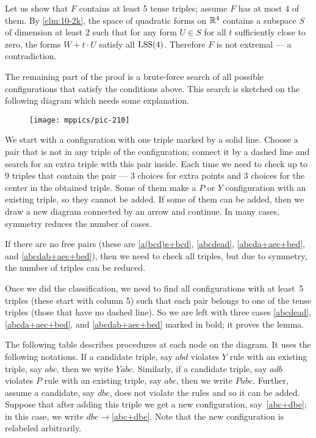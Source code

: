 \documentclass{article}
\begin{document}
Let us show that $F$ contains at least 5 tense triples;
assume $F$ has at most $4$ of them.
By \ref{clm:10-2k}, the space of quadratic forms on $\mathbb{R}^4$ contains a subspace $S$ of dimension at least 2 such that for any form $U\in S$ for all $t$ sufficiently close to zero, the forms $W+t\cdot U$ satisfy all $\mathrm{LSS}(4)$.
Therefore $F$ is not extremal --- a contradiction.

The remaining part of the proof is a brute-force search of all possible configurations that satisfy the conditions above.
This search is sketched on the following diagram which needs some explanation.
\begin{figure}[ht!]
\centering
\texttt{[image: mppics/pic-210]}
\end{figure}\label{pic-210}
We start with a configuration with one triple marked by a solid line.
Choose a pair that is not in any triple of the configuration;
connect it by a dashed line and search for an extra triple with this pair inside.
Each time we need to check up to 9 triples that contain the pair --- 3 choices for extra points and 3 choices for the center in the obtained triple.
Some of them make a $P$ or $Y$ configuration with an existing triple, so they cannot be added.
If some of them can be added, then we draw a new diagram connected by an arrow and continue.
In many cases, symmetry reduces the number of cases.
 

If there are no free pairs (these are \ref{a(bcd)e+bcd}, \ref{abcdead}, \ref{abcda+aec+bed}, and \ref{abcdab+aec+bed}),
then we need to check all triples,
but due to symmetry, the number of triples can be reduced.

Once we did the classification, we need to find all configurations with at least~5 triples (these start with column 5)
such that each pair belongs to one of the tense triples (those that have no dashed line).
So we are left with three cases \ref{abcdead}, \ref{abcda+aec+bed}, and \ref{abcdab+aec+bed} marked in bold;
it proves the lemma.

The following table describes procedures at each node on the diagram.
It uses the following notations.
If a candidate triple, say $abd$ violates $Y$ rule with an existing triple, say $abc$, then we write $Yabc$.
Similarly, if a candidate triple, say $adb$ violates $P$ rule with an existing triple, say $abc$, then we write $Pabc$.
Further, assume a candidate, say $dbe$, does not violate the rules and so it can be added.
Suppose that after adding this triple we get a new configuration, say~\ref{abc+dbe};
in this case, we write $dbe{\to}$\ref{abc+dbe}.
Note that the new configuration is relabeled arbitrarily.
\end{document}
